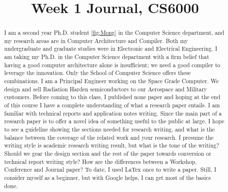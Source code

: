 \documentclass[conference]{IEEEtran}
\begin{document}
\title{Week 1 Journal, CS6000}


\author{

}

\maketitle

\begin{abstract}

I am a second year Ph.D. student \ref{fig:Mong} in the Computer Science department, and my research areas are in Computer Architecture and Compiler. Both my undergraduate and graduate studies were in Electronic and Electrical Engineering. I am taking my Ph.D. in the Computer Science department with a firm belief that having a good computer architecture alone is insufficient; we need a good compiler to leverage the innovation. Only the School of Computer Science offers these combinations.   
I am a Principal Engineer working on the Space Grade Computer. We design and sell Radiation Harden semiconductors to our Aerospace and Military customers. Before coming to this class, I published none paper and hoping at the end of this course I have a complete understanding of what a research paper entails. I am familiar with technical reports and application notes writing.  Since the main part of a research paper is to offer a novel idea of something useful to the public at large. I hope to see a guideline showing the sections needed for research writing, and what is the balance between the coverage of the related work and your research. I presume the writing style is academic research writing result, but what is the tone of the writing? Should we gear the design section and the rest of the paper towards conversion or technical report writing style? How are the differences between a Workshop, Conference and Journal paper? To date, I used LaTex once to write a paper. Still, I consider myself as a beginner, but with Google helps, I can get most of the basics done.
\end{abstract}
\end{document}
